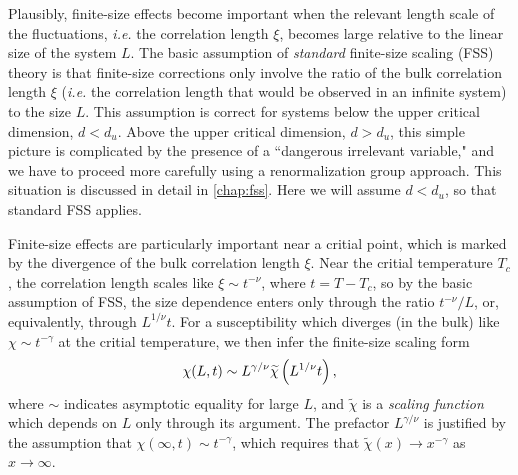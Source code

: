 Plausibly, finite-size effects become important when the relevant length scale
of the fluctuations, \emph{i.e.} the correlation length $\xi$, becomes large
relative to the linear size of the system $L$. The basic assumption of
\emph{standard} finite-size scaling (FSS) theory is that finite-size
corrections only involve the ratio of the bulk correlation length $\xi$
(\emph{i.e.} the correlation length that would be observed in an infinite
system) to the size $L$. This assumption is correct for systems below the upper
critical dimension, $d<d_u$. Above the upper critical dimension, $d>d_u$, this
simple picture is complicated by the presence of a ``dangerous irrelevant
variable," \autocite{binder1985finite} and we have to proceed more carefully
using a renormalization group approach. This situation is discussed in detail
in \cref{chap:fss}. Here we will assume $d<d_u$, so that standard FSS applies.

Finite-size effects are particularly important near a critial point, which is
marked by the divergence of the bulk correlation length $\xi$. Near the critial
temperature $T_c$, the correlation length scales like $\xi \sim t^{-\nu}$,
where $t=T-T_c$, so by the basic assumption of FSS, the size dependence enters
only through the ratio $t^{-\nu}/L$, or, equivalently, through $L^{1/\nu} t$.
For a susceptibility which diverges (in the bulk) like $\chi \sim t^{-\gamma}$
at the critial temperature, we then infer the finite-size scaling form
\begin{equation}
  \chi(L,t) \sim L^{\gamma/\nu} \widetilde{\chi}\left(L^{1/\nu} t\right),
  \label{eq:standard-fss-susc}
\end{equation}
where $\sim$ indicates asymptotic equality for large $L$, and
$\widetilde{\chi}$ is a \emph{scaling function} which depends on $L$ only
through its argument. The prefactor $L^{\gamma/\nu}$ is justified by the
assumption that $\chi(\infty,t) \sim t^{-\gamma}$, which requires that
$\widetilde{\chi}(x) \to x^{-\gamma}$ as $x \to \infty$.

